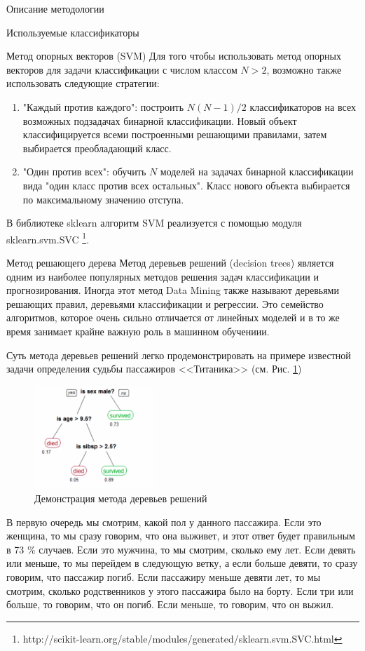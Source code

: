 \begin{section}{Описание методологии}
\begin{subsection}{Используемые классификаторы}
\begin{subsubsection}{Метод опорных векторов (SVM)}
Для того чтобы использовать метод опорных векторов для задачи классификации с числом классом $N > 2$, возможно также использовать следующие стратегии:
\begin{enumerate}
  \item "Каждый против каждого": построить $N(N-1)/2$ классификаторов на всех возможных подзадачах бинарной классификации. Новый объект классифицируется всеми построенными решающими правилами, затем выбирается преобладающий класс.
  \item "Один против всех": обучить $N$ моделей на задачах бинарной классификации вида "один класс против всех остальных". Класс нового объекта выбирается по максимальному значению отступа.
\end{enumerate}

В библиотеке sklearn алгоритм SVM реализуется с помощью модуля sklearn.svm.SVC \footnote{http://scikit-learn.org/stable/modules/generated/sklearn.svm.SVC.html}.
    \end{subsubsection}

    \begin{subsubsection}{Метод решающего дерева}
Метод деревьев решений (decision trees) является одним из наиболее популярных методов решения задач классификации и прогнозирования. Иногда этот метод Data Mining также называют деревьями решающих правил, деревьями классификации и регрессии. Это семейство алгоритмов, которое очень сильно отличается от линейных моделей и в то же время занимает крайне важную роль в машинном обучениии.

Суть метода деревьев решений легко продемонстрировать на примере известной задачи определения судьбы пассажиров <<Титаника>> (см. Рис. \ref{pic:dt1})

\begin{figure}[ht!]
\centering
\includegraphics[width=0.4\textwidth]{pics/dt1}
\caption{Демонстрация метода деревьев решений}
\label{pic:dt1}
\end{figure}

 В первую очередь мы смотрим, какой пол у данного пассажира. Если это женщина, то мы сразу говорим, что она выживет, и этот ответ будет правильным в 73 \% случаев. Если это мужчина, то мы смотрим, сколько ему лет. Если девять или меньше, то мы перейдем в следующую ветку, а если больше девяти, то сразу говорим, что пассажир погиб. Если пассажиру меньше девяти лет, то мы смотрим, сколько родственников у этого пассажира было на борту. Если три или больше, то говорим, что он погиб. Если меньше, то говорим, что он выжил.


\end{subsubsection}
\end{subsection}
\end{section}
